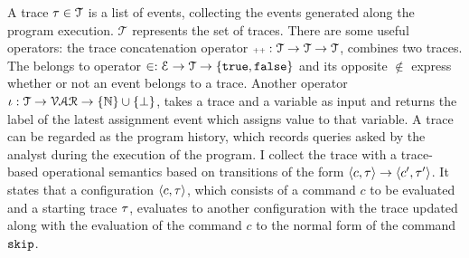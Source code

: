 A trace $\mathtt{\tau} \in \mathcal{T} $ is a list of events, 
collecting the events generated along the program execution. $\mathcal{T} $ represents the set of traces. There are some useful operators: the trace concatenation operator ${\scriptscriptstyle ++}: \mathcal{T} \to \mathcal{T} \to \mathcal{T}$, combines two traces.
The belongs to operator $\in : \mathcal{E} \to \mathcal{T} \to \{\mathtt{true}, \mathtt{false} \} $ and its opposite $\not\in$
express whether or not an event belongs to a trace.
Another operator $\iota : \mathcal{T} \to \mathcal{VAR} \to \{\mathbb{N}\}\cup \{\bot\}$,
takes a trace and a variable as input and returns the label of the latest assignment event which assigns value to that variable. 
%
A trace can be regarded as the program history, which records queries asked by the analyst during the execution of the program. I collect the trace with a trace-based operational semantics based on transitions of the form $ \langle c, \mathtt{\tau} \rangle \to \langle c', \mathtt{\tau}' \rangle $. It states that a configuration $\langle c, \mathtt{\tau} \rangle$, which consists of a command $c$ to be evaluated and a starting trace $\mathtt{\tau}$, evaluates to another configuration with the trace updated along with the evaluation of the command $c$ to the normal form of the command $\mathtt{skip}$.
